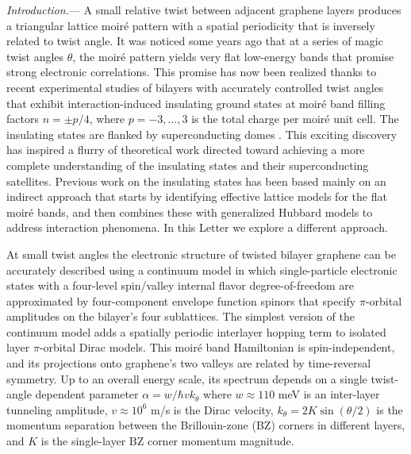 \documentclass[aps,prl,reprint,amssymb,groupedaddress,twocolumn]{revtex4}
\begin{document}
{\em Introduction.}---
A small relative twist between adjacent graphene layers produces a triangular lattice moir\'e pattern
with a spatial periodicity that is inversely related to twist angle.  It was noticed \cite{MorellFlatBand,BMModel}
some years ago that at a series of magic twist angles $\theta$, the moir{\'e} pattern yields
very flat low-energy bands that promise strong electronic correlations.  This promise has now been
realized thanks to recent experimental studies 
\cite{Tutuc2017,CaoInsulator,CaoSuper,YoungDean, Efetov, Gordon, Andrei, Pasupathy, Yazdani}
of bilayers with accurately controlled twist angles that exhibit  
interaction-induced insulating ground states at moir{\'e} band \cite{BMModel} filling factors
$n= \pm p/4$, where $p = -3, \ldots, 3$ is the total charge per moir\'e unit cell.  The insulating 
states are flanked by superconducting domes \cite{CaoSuper, Efetov}.
This exciting discovery has inspired a flurry of theoretical work 
\cite{FuModel, VishwanathMarch, Scalettar, Phillips, SpinLiquid, WangModel, MottAF, Yang, PALee, 
	      Vafek, Rademaker, KoshinoFu, Bascones, Ochi, FuJune, AFMonHoneyComb, 
	       XuBalents, FuSuper, Juricic, Das, Super1, Super2, Super3, Super4}
directed toward achieving a more complete understanding 
of the insulating states and their superconducting satellites.  Previous work on the 
insulating states has been based mainly on an indirect approach that starts by 
identifying effective lattice models for the flat moir\'e bands, and then 
combines these with generalized Hubbard models to address interaction phenomena.  
In this Letter we explore a different approach.

At small twist angles the electronic structure of twisted bilayer graphene can be accurately
described using a continuum model \cite{BMModel, SantosEarly} in which single-particle electronic states 
with a four-level spin/valley internal flavor degree-of-freedom
are approximated by four-component envelope function spinors that specify $\pi$-orbital
amplitudes on the bilayer's four sublattices.
The simplest version of the continuum model \cite{BMModel}
adds a spatially periodic interlayer 
hopping term to isolated layer $\pi$-orbital Dirac models.
This moir\'e band Hamiltonian is spin-independent, and its projections onto graphene's two valleys
are related by time-reversal symmetry.  Up to an overall energy scale, its spectrum depends 
on a single twist-angle dependent parameter 
$\alpha = w/\hbar vk_{\theta}$ where $w \approx 110$ meV is an inter-layer tunneling 
amplitude, $v \approx 10^{6} $ m/s
is the Dirac velocity,
$k_{\theta} = 2 K \sin(\theta/2)$ is the momentum 
separation between the Brillouin-zone (BZ) corners in different layers, 
and $K$ is the single-layer BZ corner momentum magnitude.
\end{document}

